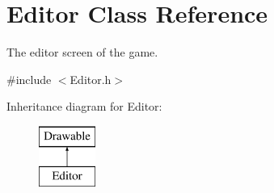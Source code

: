 \hypertarget{class_editor}{}\section{Editor Class Reference}
\label{class_editor}


The editor screen of the game.  




{\ttfamily \#include $<$Editor.\+h$>$}

Inheritance diagram for Editor\+:\begin{figure}[H]
\begin{center}
\leavevmode
\includegraphics[height=2.000000cm]{class_editor}
\end{center}
\end{figure}
